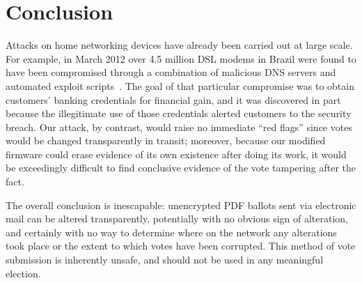 \documentclass{article}
\begin{document}
\section{Conclusion}

Attacks on home networking devices have already been carried out at
large scale. For example, in March 2012 over 4.5 million DSL modems in
Brazil were found to have been compromised through a combination of
malicious DNS servers and automated exploit
scripts~\cite{BrazilExploit}. The goal of that particular compromise
was to obtain customers' banking credentials for financial gain, and
it was discovered in part because the illegitimate use of those
credentials alerted customers to the security breach. Our attack, by
contrast, would raise no immediate ``red flags'' since votes would be
changed transparently in transit; moreover, because our modified
firmware could erase evidence of its own existence after doing its
work, it would be exceedingly difficult to find conclusive evidence of
the vote tampering after the fact.

The overall conclusion is inescapable: unencrypted PDF ballots sent
via electronic mail can be altered transparently, potentially with no
obvious sign of alteration, and certainly with no way to determine
where on the network any alterations took place or the extent to which
votes have been corrupted. This method of vote submission is
inherently unsafe, and should not be used in any meaningful election.










% 
\end{document}
